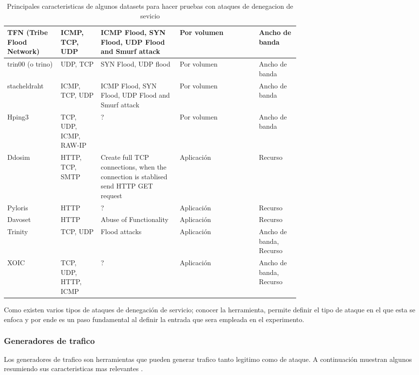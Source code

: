 \documentclass[12pt]{article}
\begin{document}
\begin{landscape}
\begin{table}[htbp]
\begin{tabular}{|p{0.1\linewidth}|p{0.1\linewidth}|p{0.2\linewidth}|p{0.2\linewidth}|p{0.1\linewidth}|}
TFN (Tribe Flood Network) &
ICMP, TCP, UDP & 
ICMP Flood, SYN Flood, UDP Flood and Smurf attack & 
Por volumen & 
Ancho de banda
\tabularnewline \hline

trin00 (o trino) &
UDP, TCP & 
SYN Flood, UDP flood & 
Por volumen & 
Ancho de banda
\tabularnewline \hline

stacheldraht &
ICMP, TCP, UDP & 
ICMP Flood, SYN Flood, UDP Flood and Smurf attack & 
Por volumen & 
Ancho de banda
\tabularnewline \hline

Hping3 &
TCP, UDP, ICMP, RAW-IP & 
? & 
Por volumen & 
Ancho de banda
\tabularnewline \hline

Ddosim &
HTTP, TCP, SMTP & 
Create full TCP connections, when the connection is stablised send HTTP GET request & 
Aplicación & 
Recurso
\tabularnewline \hline

Pyloris &
HTTP & 
? & 
Aplicación & 
Recurso
\tabularnewline \hline

Davoset &
HTTP & 
Abuse of Functionality & 
Aplicación & 
Recurso
\tabularnewline \hline

Trinity &
TCP, UDP & 
Flood attacks & 
Aplicación & 
Ancho de banda, Recurso
\tabularnewline \hline

XOIC &
TCP, UDP, HTTP,  ICMP & 
? & 
Aplicación & 
Ancho de banda, Recurso
\tabularnewline \hline


\end{tabular}
\caption{Principales caracteristicas de algunos datasets para hacer pruebas con ataques de denegacion de sevicio} \label{tab:sometab}
\end{table} 


\end{landscape}
\newpage


Como existen varios tipos de ataques de denegación de servicio; conocer la herramienta, permite definir el tipo de ataque en el que esta se enfoca y por ende es un paso fundamental al definir la entrada que sera empleada en el experimento.

\subsubsection{Generadores de trafico}

Los generadores de trafico son herramientas que pueden generar trafico tanto legitimo como de ataque. A continuación muestran algunos resumiendo sus caracteristicas mas relevantes \citep{dos_tools}. 
\end{document}
